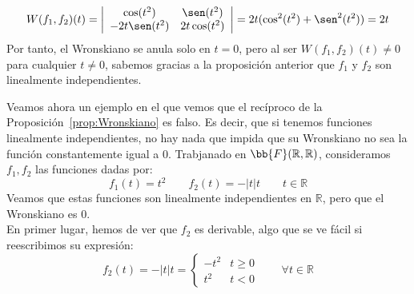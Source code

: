 \begin{ejemplo}
\begin{itemize}
            \begin{equation*}
                W(f_1,f_2)(t) = \left|\begin{array}{cc}
                    \cos(t^2) & \sen(t^2) \\
                    -2t\sen(t^2) & 2t\cos(t^2) 
                \end{array}\right| = 2t (\cos^2(t^2) + \sen^2(t^2))= 2t
            \end{equation*}
            Por tanto, el Wronskiano se anula solo en $t=0$, pero al ser $W(f_1,f_2)(t) \neq 0$ para cualquier $t\neq 0$, sabemos gracias a la proposición anterior que $f_1$ y $f_2$ son linealmente independientes.
    \end{itemize}
\end{ejemplo}

\begin{ejemplo}
    Veamos ahora un ejemplo en el que vemos que el recíproco de la Proposición~\ref{prop:Wronskiano} es falso. Es decir, que si tenemos funciones linealmente independientes, no hay nada que impida que su Wronskiano no sea la función constantemente igual a 0. Trabjanado en $\bb{F}(\mathbb{R},\mathbb{R})$, consideramos $f_1,f_2$ las funciones dadas por:
    \begin{equation*}
        f_1(t) = t^2 \qquad f_2(t) = -|t|t \qquad t\in \mathbb{R}
    \end{equation*}
    Veamos que estas funciones son linealmente independientes en $\mathbb{R}$, pero que el Wronskiano es 0.\\

    En primer lugar, hemos de ver que $f_2$ es derivable, algo que se ve fácil si reescribimos su expresión:
    \begin{equation*}
        f_2(t) = -|t|t = \left\{\begin{array}{rr}
                -t^2 & t \geq 0 \\
                t^2 & t<0
        \end{array}\right. \qquad \forall t\in \mathbb{R}
    \end{equation*}


\end{ejemplo}
